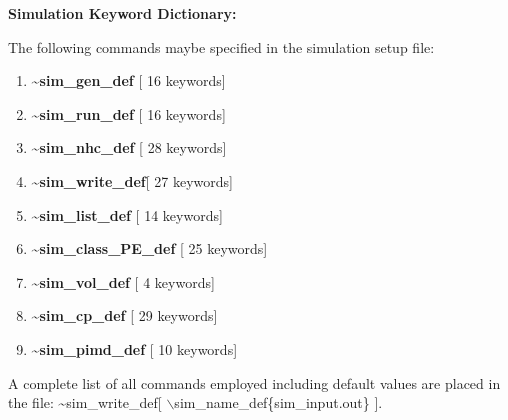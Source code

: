\documentclass[12pt]{article}
\begin{document}
\clearpage
\begin{center}
\huge
{\bf Simulation Keyword Dictionary: } 
\end{center}
\LARGE

The following commands maybe specified in the simulation setup file:
\begin{enumerate}
\LARGE
\item {\bf \~{}sim\_gen\_def} [ 16 keywords]
\item {\bf \~{}sim\_run\_def} [ 16 keywords]
\item {\bf \~{}sim\_nhc\_def} [ 28 keywords]
\item {\bf \~{}sim\_write\_def}[ 27 keywords]
\item {\bf \~{}sim\_list\_def} [ 14 keywords]
\item {\bf \~{}sim\_class\_PE\_def} [ 25 keywords]
\item {\bf \~{}sim\_vol\_def} [ 4 keywords]
\item {\bf \~{}sim\_cp\_def} [ 29 keywords]
\item {\bf \~{}sim\_pimd\_def} [ 10 keywords]
\end{enumerate}
\large
A complete list of all commands employed including default
values are placed in the file:
\~{}sim\_write\_def[ $\backslash$sim\_name\_def\{sim\_input.out\} ]. 


\clearpage
\end{document}
